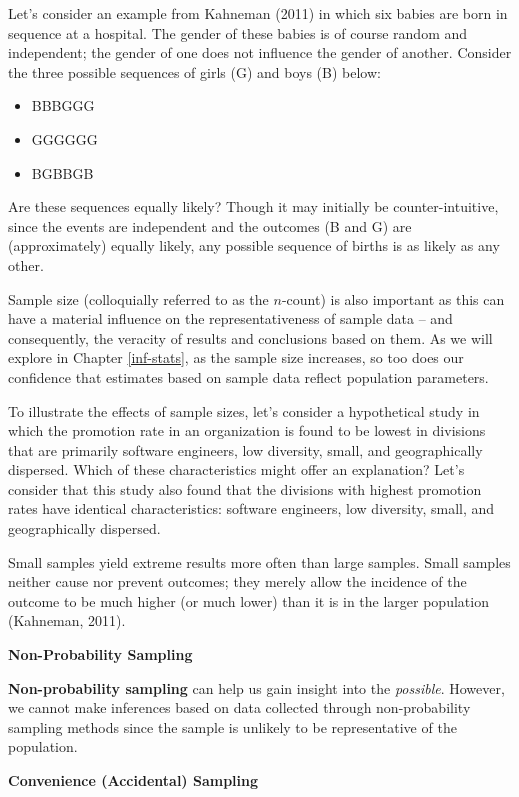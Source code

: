\documentclass[]{book}
\providecommand{\tightlist}{%
  \setlength{\itemsep}{0pt}\setlength{\parskip}{0pt}}
\begin{document}
Let's consider an example from Kahneman (2011) in which six babies are born in sequence at a hospital. The gender of these babies is of course random and independent; the gender of one does not influence the gender of another. Consider the three possible sequences of girls (G) and boys (B) below:

\begin{itemize}
\tightlist
\item
  BBBGGG
\item
  GGGGGG
\item
  BGBBGB
\end{itemize}

Are these sequences equally likely? Though it may initially be counter-intuitive, since the events are independent and the outcomes (B and G) are (approximately) equally likely, any possible sequence of births is as likely as any other.

Sample size (colloquially referred to as the \(n\)-count) is also important as this can have a material influence on the representativeness of sample data -- and consequently, the veracity of results and conclusions based on them. As we will explore in Chapter \ref{inf-stats}, as the sample size increases, so too does our confidence that estimates based on sample data reflect population parameters.

To illustrate the effects of sample sizes, let's consider a hypothetical study in which the promotion rate in an organization is found to be lowest in divisions that are primarily software engineers, low diversity, small, and geographically dispersed. Which of these characteristics might offer an explanation? Let's consider that this study also found that the divisions with highest promotion rates have identical characteristics: software engineers, low diversity, small, and geographically dispersed.

Small samples yield extreme results more often than large samples. Small samples neither cause nor prevent outcomes; they merely allow the incidence of the outcome to be much higher (or much lower) than it is in the larger population (Kahneman, 2011).

\textbf{Non-Probability Sampling}

\textbf{Non-probability sampling} can help us gain insight into the \emph{possible}. However, we cannot make inferences based on data collected through non-probability sampling methods since the sample is unlikely to be representative of the population.

\textbf{Convenience (Accidental) Sampling}
\end{document}
